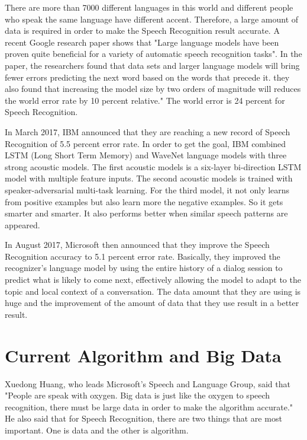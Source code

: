 \documentclass[sigconf]{acmart}
\begin{document}
There are more than 7000 different languages in this world and different people who speak the same language have different accent. Therefore, a large amount of data is required in order to make the Speech Recognition result accurate. A recent Google research paper shows that "Large language models have been proven quite beneficial for a variety of automatic speech recognition tasks".\cite{40491} In the paper, the researchers found that data sets and larger language models will bring fewer errors predicting the next word based on the words that precede it. they also found that increasing the model size by two orders of magnitude will reduces the world error rate by 10 percent relative." The world error is 24 percent for Speech Recognition.

In March 2017, IBM announced that they are reaching a new record of Speech Recognition of 5.5 percent error rate. In order to get the goal, IBM  combined LSTM (Long Short Term Memory) and WaveNet language models with three strong acoustic models.\cite{ibm} The first acoustic models is a six-layer bi-direction LSTM model with multiple feature inputs. The second acoustic models is trained with speaker-adversarial multi-task learning. For the third model, it not only learns from positive examples but also learn more the negative examples. So it gets smarter and smarter. It also performs better when similar speech patterns are appeared.

In August 2017, Microsoft then announced that they improve the Speech Recognition accuracy to 5.1 percent error rate. Basically, they improved the recognizer's language model by using the entire history of a dialog session to predict what is likely to come next, effectively allowing the model to adapt to the topic and local context of a conversation.\cite{microsoft} The data amount that they are using is huge and the improvement of the amount of data that they use result in a better result. 

\section{Current Algorithm and Big Data}
Xuedong Huang, who leads Microsoft's Speech and Language Group, said that "People are speak with oxygen. Big data is just like the oxygen to speech recognition, there must be large data in order to make the algorithm accurate." He also said that for Speech Recognition, there are two things that are most important. One is data and the other is algorithm.\cite{hxd} 
\end{document}
